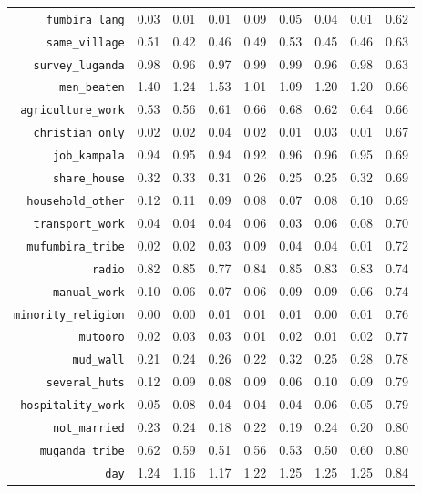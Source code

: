 \begin{longtable}{rrrrrrrrr}
  {\texttt{fumbira\_lang}} & 0.03 & 0.01 & 0.01 & 0.09 & 0.05 & 0.04 & 0.01 & 0.62 \\ 
  {\texttt{same\_village}} & 0.51 & 0.42 & 0.46 & 0.49 & 0.53 & 0.45 & 0.46 & 0.63 \\ 
  {\texttt{survey\_luganda}} & 0.98 & 0.96 & 0.97 & 0.99 & 0.99 & 0.96 & 0.98 & 0.63 \\ 
  {\texttt{men\_beaten}} & 1.40 & 1.24 & 1.53 & 1.01 & 1.09 & 1.20 & 1.20 & 0.66 \\ 
  {\texttt{agriculture\_work}} & 0.53 & 0.56 & 0.61 & 0.66 & 0.68 & 0.62 & 0.64 & 0.66 \\ 
  {\texttt{christian\_only}} & 0.02 & 0.02 & 0.04 & 0.02 & 0.01 & 0.03 & 0.01 & 0.67 \\ 
  {\texttt{job\_kampala}} & 0.94 & 0.95 & 0.94 & 0.92 & 0.96 & 0.96 & 0.95 & 0.69 \\ 
  {\texttt{share\_house}} & 0.32 & 0.33 & 0.31 & 0.26 & 0.25 & 0.25 & 0.32 & 0.69 \\ 
  {\texttt{household\_other}} & 0.12 & 0.11 & 0.09 & 0.08 & 0.07 & 0.08 & 0.10 & 0.69 \\ 
  {\texttt{transport\_work}} & 0.04 & 0.04 & 0.04 & 0.06 & 0.03 & 0.06 & 0.08 & 0.70 \\ 
  {\texttt{mufumbira\_tribe}} & 0.02 & 0.02 & 0.03 & 0.09 & 0.04 & 0.04 & 0.01 & 0.72 \\ 
  {\texttt{radio}} & 0.82 & 0.85 & 0.77 & 0.84 & 0.85 & 0.83 & 0.83 & 0.74 \\ 
  {\texttt{manual\_work}} & 0.10 & 0.06 & 0.07 & 0.06 & 0.09 & 0.09 & 0.06 & 0.74 \\ 
  {\texttt{minority\_religion}} & 0.00 & 0.00 & 0.01 & 0.01 & 0.01 & 0.00 & 0.01 & 0.76 \\ 
  {\texttt{mutooro}} & 0.02 & 0.03 & 0.03 & 0.01 & 0.02 & 0.01 & 0.02 & 0.77 \\ 
  {\texttt{mud\_wall}} & 0.21 & 0.24 & 0.26 & 0.22 & 0.32 & 0.25 & 0.28 & 0.78 \\ 
  {\texttt{several\_huts}} & 0.12 & 0.09 & 0.08 & 0.09 & 0.06 & 0.10 & 0.09 & 0.79 \\ 
  {\texttt{hospitality\_work}} & 0.05 & 0.08 & 0.04 & 0.04 & 0.04 & 0.06 & 0.05 & 0.79 \\ 
  {\texttt{not\_married}} & 0.23 & 0.24 & 0.18 & 0.22 & 0.19 & 0.24 & 0.20 & 0.80 \\ 
  {\texttt{muganda\_tribe}} & 0.62 & 0.59 & 0.51 & 0.56 & 0.53 & 0.50 & 0.60 & 0.80 \\ 
  {\texttt{day}} & 1.24 & 1.16 & 1.17 & 1.22 & 1.25 & 1.25 & 1.25 & 0.84 \\ 

\end{longtable}
